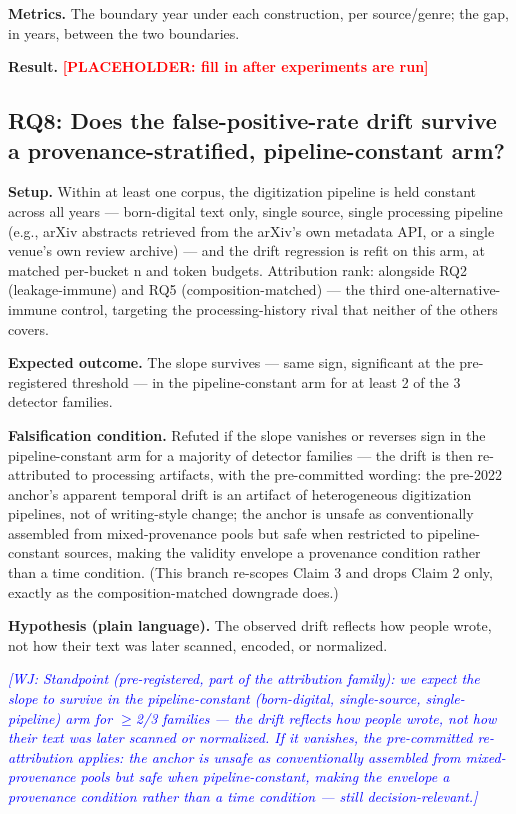 \documentclass[conference]{IEEEtran}
\newcommand{\placeholder}[1]{\textcolor{red}{\textbf{[PLACEHOLDER: #1]}}}
\newcommand{\wj}[1]{\textcolor{blue}{\emph{[WJ: #1]}}}
\begin{document}
\textbf{Metrics.} The boundary year under each construction, per source/genre; the gap, in years, between the two boundaries.

\textbf{Result.} \placeholder{fill in after experiments are run}

\subsection{RQ8: Does the false-positive-rate drift survive a provenance-stratified, pipeline-constant arm?}

 \textbf{Setup.} Within at least one corpus, the digitization pipeline is held constant across all years --- born-digital text only, single source, single processing pipeline (e.g., arXiv abstracts retrieved from the arXiv's own metadata API, or a single venue's own review archive) --- and the drift regression is refit on this arm, at matched per-bucket n and token budgets. Attribution rank: alongside RQ2 (leakage-immune) and RQ5 (composition-matched) --- the third one-alternative-immune control, targeting the processing-history rival that neither of the others covers.

\textbf{Expected outcome.} The slope survives --- same sign, significant at the pre-registered threshold --- in the pipeline-constant arm for at least 2 of the 3 detector families.

\textbf{Falsification condition.} Refuted if the slope vanishes or reverses sign in the pipeline-constant arm for a majority of detector families --- the drift is then re-attributed to processing artifacts, with the pre-committed wording: the pre-2022 anchor's apparent temporal drift is an artifact of heterogeneous digitization pipelines, not of writing-style change; the anchor is unsafe as conventionally assembled from mixed-provenance pools but safe when restricted to pipeline-constant sources, making the validity envelope a provenance condition rather than a time condition. (This branch re-scopes Claim 3 and drops Claim 2 only, exactly as the composition-matched downgrade does.)

\textbf{Hypothesis (plain language).} The observed drift reflects how people wrote, not how their text was later scanned, encoded, or normalized.

\wj{Standpoint (pre-registered, part of the attribution family): we expect the slope to survive in the pipeline-constant (born-digital, single-source, single-pipeline) arm for $\geq$2/3 families --- the drift reflects how people wrote, not how their text was later scanned or normalized. If it vanishes, the pre-committed re-attribution applies: the anchor is unsafe as conventionally assembled from mixed-provenance pools but safe when pipeline-constant, making the envelope a provenance condition rather than a time condition --- still decision-relevant.}
\end{document}
